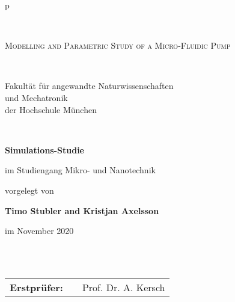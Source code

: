 \begin{center}
\begin{tabular}{p{\textwidth}}



\\

\begin{center}
\LARGE{\textsc{
Modelling and Parametric Study of a Micro-Fluidic Pump\\
}}
\end{center}

\\


\begin{center}
\large{Fakultät für angewandte Naturwissenschaften \\
und Mechatronik \\
der Hochschule München}
\end{center}

\\

\begin{center}
\textbf{\Large{Simulations-Studie}}
\end{center}


\begin{center}
im Studiengang Mikro- und Nanotechnik
\end{center}


\begin{center}
vorgelegt von
\end{center}

\begin{center}
\large{\textbf{Timo Stubler and Kristjan Axelsson}} \\
\end{center}

\begin{center}
\large{im November 2020}
\end{center}

\\

\\

\begin{center}
\begin{tabular}{lll}
\textbf{Erstprüfer:} & & Prof. Dr. A. Kersch\\
\end{tabular}
\end{center}

\end{tabular}
\end{center}